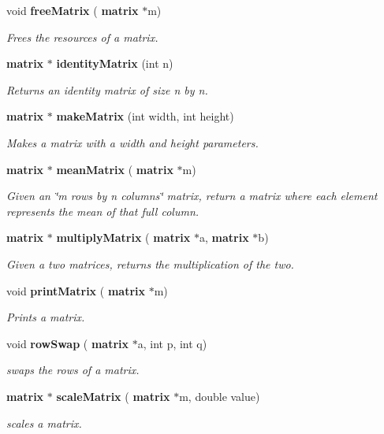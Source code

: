 \begin{DoxyCompactItemize}
void \textbf{ free\+Matrix} (\textbf{ matrix} $\ast$m)
\begin{DoxyCompactList}\small\item\em Frees the resources of a matrix. \end{DoxyCompactList}\item 
\textbf{ matrix} $\ast$ \textbf{ identity\+Matrix} (int n)
\begin{DoxyCompactList}\small\item\em Returns an identity matrix of size n by n. \end{DoxyCompactList}\item 
\textbf{ matrix} $\ast$ \textbf{ make\+Matrix} (int width, int height)
\begin{DoxyCompactList}\small\item\em Makes a matrix with a width and height parameters. \end{DoxyCompactList}\item 
\textbf{ matrix} $\ast$ \textbf{ mean\+Matrix} (\textbf{ matrix} $\ast$m)
\begin{DoxyCompactList}\small\item\em Given an \char`\"{}m rows by n columns\char`\"{} matrix, return a matrix where each element represents the mean of that full column. \end{DoxyCompactList}\item 
\textbf{ matrix} $\ast$ \textbf{ multiply\+Matrix} (\textbf{ matrix} $\ast$a, \textbf{ matrix} $\ast$b)
\begin{DoxyCompactList}\small\item\em Given a two matrices, returns the multiplication of the two. \end{DoxyCompactList}\item 
void \textbf{ print\+Matrix} (\textbf{ matrix} $\ast$m)
\begin{DoxyCompactList}\small\item\em Prints a matrix. \end{DoxyCompactList}\item 
void \textbf{ row\+Swap} (\textbf{ matrix} $\ast$a, int p, int q)
\begin{DoxyCompactList}\small\item\em swaps the rows of a matrix. \end{DoxyCompactList}\item 
\textbf{ matrix} $\ast$ \textbf{ scale\+Matrix} (\textbf{ matrix} $\ast$m, double value)
\begin{DoxyCompactList}\small\item\em scales a matrix. \end{DoxyCompactList}\item 

\end{DoxyCompactItemize}
